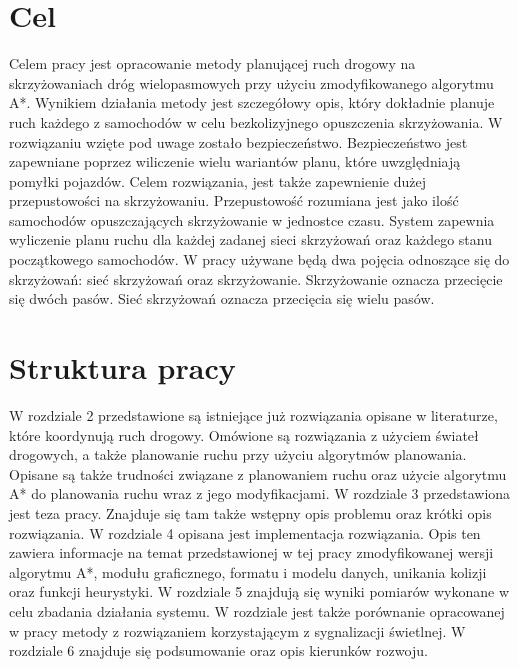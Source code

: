 \section{Cel}

Celem pracy jest opracowanie metody planującej ruch drogowy na skrzyżowaniach dróg wielopasmowych przy użyciu zmodyfikowanego algorytmu A*. Wynikiem działania metody jest szczegółowy opis, który dokładnie planuje ruch każdego z samochodów w celu bezkolizyjnego opuszczenia skrzyżowania. W rozwiązaniu wzięte pod uwage zostało bezpieczeństwo. Bezpieczeństwo jest zapewniane poprzez wiliczenie wielu wariantów planu, które uwzględniają pomyłki pojazdów. Celem rozwiązania, jest także zapewnienie dużej przepustowości na skrzyżowaniu. Przepustowość rozumiana jest jako ilość samochodów opuszczających skrzyżowanie w jednostce czasu. System zapewnia wyliczenie planu ruchu dla każdej zadanej sieci skrzyżowań oraz każdego stanu początkowego samochodów.
\newline
\indent
W pracy używane będą dwa pojęcia odnoszące się do skrzyżowań: sieć skrzyżowań oraz skrzyżowanie. Skrzyżowanie oznacza przecięcie się dwóch pasów. Sieć skrzyżowań oznacza przecięcia się wielu pasów.

\section{Struktura pracy}

W rozdziale 2 przedstawione są istniejące już rozwiązania opisane w literaturze, które koordynują ruch drogowy. Omówione są rozwiązania z użyciem świateł drogowych, a także planowanie ruchu przy użyciu algorytmów planowania. Opisane są także trudności związane z planowaniem ruchu oraz użycie algorytmu A* do planowania ruchu wraz z jego modyfikacjami.
\newline
\indent
W rozdziale 3 przedstawiona jest teza pracy. Znajduje się tam także wstępny opis problemu oraz krótki opis rozwiązania.
\newline
\indent
W rozdziale 4 opisana jest implementacja rozwiązania. Opis ten zawiera informacje na temat przedstawionej w tej pracy zmodyfikowanej wersji algorytmu A*, modułu graficznego, formatu i modelu danych, unikania kolizji oraz funkcji heurystyki.
\newline
\indent
W rozdziale 5 znajdują się wyniki pomiarów wykonane w celu zbadania działania systemu. W rozdziale jest także porównanie opracowanej w pracy metody z rozwiązaniem korzystającym z sygnalizacji świetlnej.
\newline
\indent
W rozdziale 6 znajduje się podsumowanie oraz opis kierunków rozwoju.
